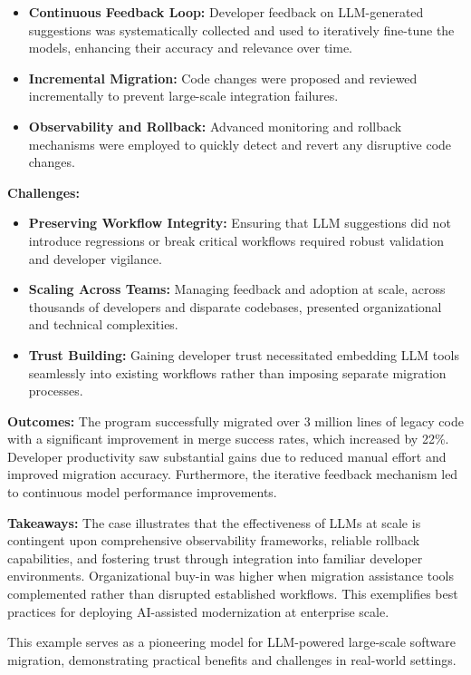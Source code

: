 \documentclass[12pt]{article}
\begin{document}
\begin{itemize}
    \item \textbf{Continuous Feedback Loop:} Developer feedback on LLM-generated suggestions was systematically collected and used to iteratively fine-tune the models, enhancing their accuracy and relevance over time.
    \item \textbf{Incremental Migration:} Code changes were proposed and reviewed incrementally to prevent large-scale integration failures.
    \item \textbf{Observability and Rollback:} Advanced monitoring and rollback mechanisms were employed to quickly detect and revert any disruptive code changes.
\end{itemize}

\textbf{Challenges:}  
\begin{itemize}
    \item \textbf{Preserving Workflow Integrity:} Ensuring that LLM suggestions did not introduce regressions or break critical workflows required robust validation and developer vigilance.
    \item \textbf{Scaling Across Teams:} Managing feedback and adoption at scale, across thousands of developers and disparate codebases, presented organizational and technical complexities.
    \item \textbf{Trust Building:} Gaining developer trust necessitated embedding LLM tools seamlessly into existing workflows rather than imposing separate migration processes.
\end{itemize}

\textbf{Outcomes:}  
The program successfully migrated over 3 million lines of legacy code with a significant improvement in merge success rates, which increased by 22\%. Developer productivity saw substantial gains due to reduced manual effort and improved migration accuracy. Furthermore, the iterative feedback mechanism led to continuous model performance improvements.

\textbf{Takeaways:}  
The case illustrates that the effectiveness of LLMs at scale is contingent upon comprehensive observability frameworks, reliable rollback capabilities, and fostering trust through integration into familiar developer environments. Organizational buy-in was higher when migration assistance tools complemented rather than disrupted established workflows. This exemplifies best practices for deploying AI-assisted modernization at enterprise scale.

This example serves as a pioneering model for LLM-powered large-scale software migration, demonstrating practical benefits and challenges in real-world settings.
\end{document}

